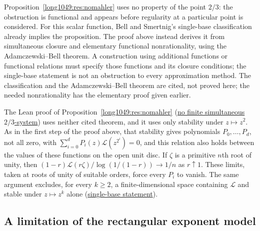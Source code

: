 Proposition~\ref{long1049:res:nomahler} uses no property of the point
$2/3$: the obstruction is functional and appears before regularity at a particular point is considered.
For this scalar function, Bell and Smertnig's single-base classification
already implies the proposition. The proof above instead derives it
from simultaneous closure and elementary functional nonrationality,
using the Adamczewski--Bell theorem.  A
construction using additional functions or functional relations must specify
those functions and its closure conditions; the single-base statement is not
an obstruction to every approximation method. The classification and the
Adamczewski--Bell theorem are cited, not proved here; the needed
nonrationality has the elementary proof given earlier.

The Lean proof of Proposition~\ref{long1049:res:nomahler}
(\href{\laterepobase/lean/ErdosProblems/Erdos1049/PaperCompleteR21/SimultaneousMahlerSystemUnconditional.lean\#L298}{no finite simultaneous $2/3$-system})
uses neither cited theorem, and it uses only stability under
$z\mapsto z^2$. As in the first step of the proof above, that stability
gives polynomials $P_0,\dots,P_d$, not all zero, with
$\sum_{i=0}^{d}P_i(z)\mathcal L(z^{2^i})=0$, and this relation also holds
between the values of these functions on the open unit disc. If $\zeta$ is
a primitive $n$th root of unity, then
$(1-r)\mathcal L(r\zeta)/\log(1/(1-r))\to1/n$ as $r\uparrow1$.
These limits, taken at roots of unity of suitable orders, force every
$P_i$ to vanish. The same argument excludes, for every $k\ge2$, a
finite-dimensional space containing $\mathcal L$ and stable under
$z\mapsto z^k$ alone
(\href{\laterepobase/lean/ErdosProblems/Erdos1049/PaperCompleteR21/SimultaneousMahlerSystemUnconditional.lean\#L263}{single-base statement}).

\subsection{A limitation of the rectangular exponent model}

